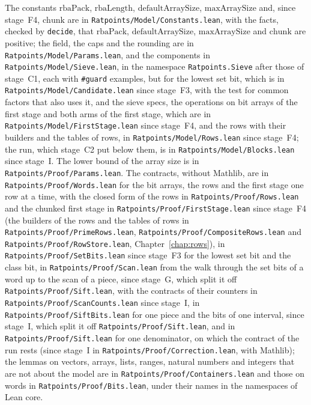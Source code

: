 The constants $\mathrm{rbaPack}$, $\mathrm{rbaLength}$, $\mathrm{defaultArraySize}$,
$\mathrm{maxArraySize}$ and, since stage~F4, $\mathrm{chunk}$ are in
\verb|Ratpoints/Model/Constants.lean|, with the facts, checked by \verb|decide|, that
$\mathrm{rbaPack}$, $\mathrm{defaultArraySize}$, $\mathrm{maxArraySize}$ and $\mathrm{chunk}$ are
positive; the field, the caps and the rounding are in \verb|Ratpoints/Model/Params.lean|, and the
components in \verb|Ratpoints/Model/Sieve.lean|, in the namespace \verb|Ratpoints.Sieve| after those
of stage~C1, each with \verb|#guard| examples, but for the lowest set bit, which is in
\verb|Ratpoints/Model/Candidate.lean| since stage~F3, with the test for common factors that also
uses it, and the sieve specs, the operations on bit arrays of the first stage and both arms of the
first stage, which are in \verb|Ratpoints/Model/FirstStage.lean| since stage~F4, and the rows with
their builders and the tables of rows, in \verb|Ratpoints/Model/Rows.lean| since stage~F4; the run,
which stage~C2 put below them, is in \verb|Ratpoints/Model/Blocks.lean| since stage~I. The
lower bound of the array size is in \verb|Ratpoints/Proof/Params.lean|. The contracts, without
Mathlib, are in \verb|Ratpoints/Proof/Words.lean| for the bit arrays, the rows and the first stage
one row at a time, with the closed form of the rows in \verb|Ratpoints/Proof/Rows.lean| and the
chunked first stage in \verb|Ratpoints/Proof/FirstStage.lean| since stage~F4 (the builders of the
rows and the tables of rows in \verb|Ratpoints/Proof/PrimeRows.lean|,
\verb|Ratpoints/Proof/CompositeRows.lean| and \verb|Ratpoints/Proof/RowStore.lean|,
Chapter~\ref{chap:rows}), in \verb|Ratpoints/Proof/SetBits.lean| since stage~F3 for the lowest set
bit and the class bit, in \verb|Ratpoints/Proof/Scan.lean| from the walk through the set bits of a
word up to the scan of a piece, since stage~G, which split it off \verb|Ratpoints/Proof/Sift.lean|,
with the contracts of their counters in \verb|Ratpoints/Proof/ScanCounts.lean| since stage~I, in
\verb|Ratpoints/Proof/SiftBits.lean| for one piece and the bits of one interval, since stage~I,
which split it off \verb|Ratpoints/Proof/Sift.lean|, and in \verb|Ratpoints/Proof/Sift.lean| for one
denominator, on which the contract of the run rests (since stage~I in
\verb|Ratpoints/Proof/Correction.lean|, with Mathlib); the lemmas on vectors, arrays, lists,
ranges, natural numbers and integers that are not about the model are in
\verb|Ratpoints/Proof/Containers.lean| and those on words in \verb|Ratpoints/Proof/Bits.lean|, under
their names in the namespaces of Lean core.

